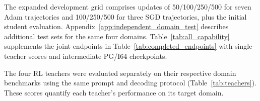 The expanded development grid comprises updates of 50/100/250/500 for seven Adam trajectories and 100/250/500 for three SGD trajectories, plus the initial student evaluation. Appendix~\ref{app:independent_domain_test} describes additional test sets for the same four domains. Table~\ref{tab:all_capability} supplements the joint endpoints in Table~\ref{tab:completed_endpoints} with single-teacher scores and intermediate PG/I64 checkpoints.

\begin{table}[t]
\caption{\textbf{PG/I64 performance depends on the task and checkpoint.} Mean scores (\%): S is mathematics-only training and M is joint training; both use DR. Joint endpoints appear in Table~\ref{tab:completed_endpoints}.}
\label{tab:all_capability}
\centering\small

\end{table}

The four RL teachers were evaluated separately on their respective domain benchmarks using the same prompt and decoding protocol (Table~\ref{tab:teachers}). These scores quantify each teacher's performance on its target domain.

\begin{table}[t]
\caption{\textbf{Reference scores for the four domain-specific teachers} (\%). Science uses GPQA average@4.}
\label{tab:teachers}
\centering\small

\end{table}

